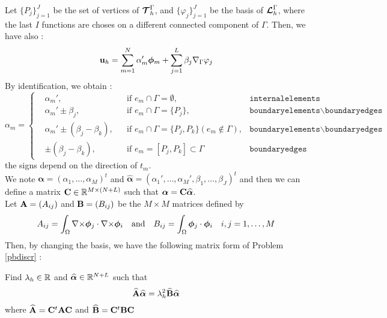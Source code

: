 Let $\{P_j\}_{j=1}^J$ be the set of vertices of ${\bm{\mathcal{T}}}_h^\Gamma$, and
$\{\varphi_j\}_{j=1}^J$ be the basis of ${\bm{\mathcal{L}}}_h^\Gamma$, where the last $I$
functions are choses on a different connected component of $\Gamma$. Then, we have also :
\[ {\mathbf{u}}_h = \sum_{m=1}^N \alpha_m'\bm{\phi}_m + \sum_{j=1}^L
\beta_j{\nabla}_\Gamma\varphi_j \]
By identification, we obtain :
\[
\alpha_m=\left\{\begin{aligned}
&\alpha_m', &&\mbox{if } e_m\cap\Gamma = \emptyset, &\texttt{internalelements}\\
&\alpha_m'\pm \beta_j, &&\mbox{if } e_m\cap\Gamma = \{P_j\},& \texttt{boundaryelements}\backslash\texttt{boundaryedges}\\
&\alpha_m'\pm (\beta_j-\beta_k), &&\mbox{if } e_m\cap\Gamma = \{P_j,P_k\}
(e_m\notin\Gamma),& \texttt{boundaryelements}\backslash\texttt{boundaryedges}\\
&\pm (\beta_j-\beta_k), &&\mbox{if } e_m=[P_j,P_k]\subset\Gamma & \texttt{boundaryedges}
\end{aligned}\right.
\]
the signs depend on the direction of $t_m$.\\

We note $\bm{\alpha}=(\alpha_1,\dots,\alpha_M)^t$ and
$\widehat{\bm{\alpha}}=(\alpha_1',\dots,\alpha_M',\beta_1,\dots,\beta_J)^t$ and
then we can define a matrix ${\mathbf{C}}\in{\mathbb{R}}^{M\times(N+L)}$ such that $\bm{\alpha}={\mathbf{C}}\widehat{\bm{\alpha}}$.\\

Let ${\mathbf{A}}=(A_{ij})$ and ${\mathbf{B}}=(B_{ij})$ be the $M\times M$ matrices defined
by 
\[A_{ij}=\int_\Omega {\nabla\times}\bm{\phi}_j\cdot{\nabla\times}\bm{\phi}_i \quad\mbox{and}\quad
B_{ij}=\int_\Omega\bm{\phi}_j\cdot\bm{\phi}_i\quad i,j=1,\dots,M \]
Then, by changing the basis, we have the following matrix form of Problem
\ref{pbdiscr} :
\begin{pb}\label{pbmat}
Find $\lambda_h\in{\mathbb{R}}$ and $\widehat{\bm{\alpha}}\in{\mathbb{R}}^{N+L}$ such that
\[ \widehat{{\mathbf{A}}}\widehat{\bm{\alpha}} =
\lambda_h^2\widehat{{\mathbf{B}}}\widehat{\bm{\alpha}} \]
where $\widehat{{\mathbf{A}}}={\mathbf{C}}^t{\mathbf{A}}{\mathbf{C}}$ and $\widehat{{\mathbf{B}}}={\mathbf{C}}^t{\mathbf{B}}{\mathbf{C}}$
\end{pb}

